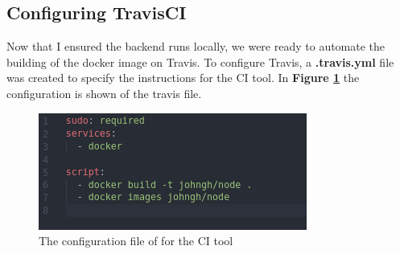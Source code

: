 \documentclass{paper}
\begin{document}
    \subsection{Configuring TravisCI}{Now that I ensured the backend runs locally, we were ready to automate the building 
    of the docker image on Travis. To configure Travis, a \textbf{.travis.yml} file was created to specify the instructions 
    for the CI tool. In \textbf{Figure \ref{fig:travis}} the configuration is shown of the travis file.
    \begin{figure}[!h]
        \centering
        \includegraphics[scale=3, pagebox=artbox]{Images/travis.png}
        \caption{The configuration file of for the CI tool}
        \label{fig:travis}
    \end{figure}
    \newline
    }
\end{document}
